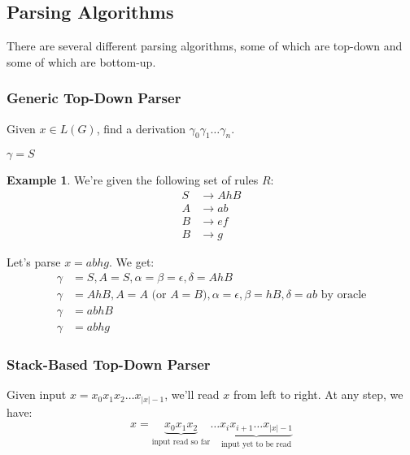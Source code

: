 \documentclass[]{article}
\theoremstyle{definition}
\newtheorem{ex}{Example}[section]
\begin{document}
		\subsection{Parsing Algorithms}
			There are several different parsing algorithms, some of which are top-down and some of which are bottom-up.
			\subsubsection{Generic Top-Down Parser}
				Given $x \in L(G)$, find a derivation $\gamma_0 \gamma_1 \ldots \gamma_n$.

				\begin{algorithm}[H]
					$\gamma = S$\;
				\end{algorithm}

				\begin{ex}
					We're given the following set of rules $R$:
					\begin{align*}
						S &\to AhB \\
						A &\to ab \\
						B &\to ef \\
						B &\to g
					\end{align*}

					Let's parse $x = abhg$. We get:
					\begin{align*}
						\gamma &= S, A = S, \alpha = \beta = \epsilon, \delta = AhB \\
						\gamma &= AhB, A = A \text{ (or } A = B), \alpha = \epsilon, \beta = hB, \delta = ab \text{ by oracle} \\
						\gamma &= abhB \\
						\gamma &= abhg
					\end{align*}
				\end{ex}

			\subsubsection{Stack-Based Top-Down Parser}
				Given input $x = x_0 x_1 x_2 \ldots x_{|x|-1}$, we'll read $x$ from left to right. At any step, we have:
				\begin{align*}
					x = \underbrace{x_0 x_1 x_2}_{\text{input read so far}} \ldots \underbrace{x_i x_{i + 1} \ldots x_{|x| - 1}}_{\text{input yet to be read}}
				\end{align*}
\end{document}
